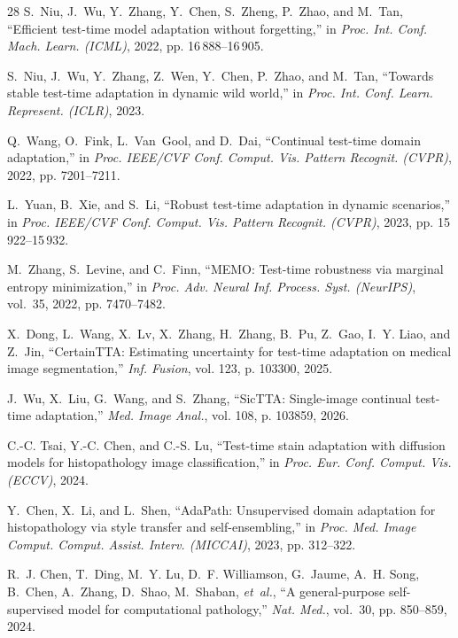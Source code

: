 \documentclass[journal]{IEEEtran}
\begin{document}
\begin{thebibliography}{28}
S.~Niu, J.~Wu, Y.~Zhang, Y.~Chen, S.~Zheng, P.~Zhao, and M.~Tan, ``Efficient test-time model adaptation without forgetting,'' in \emph{Proc. Int. Conf. Mach. Learn. (ICML)}, 2022, pp. 16\,888--16\,905.

S.~Niu, J.~Wu, Y.~Zhang, Z.~Wen, Y.~Chen, P.~Zhao, and M.~Tan, ``Towards stable test-time adaptation in dynamic wild world,'' in \emph{Proc. Int. Conf. Learn. Represent. (ICLR)}, 2023.

Q.~Wang, O.~Fink, L.~Van~Gool, and D.~Dai, ``Continual test-time domain adaptation,'' in \emph{Proc. IEEE/CVF Conf. Comput. Vis. Pattern Recognit. (CVPR)}, 2022, pp. 7201--7211.

L.~Yuan, B.~Xie, and S.~Li, ``Robust test-time adaptation in dynamic scenarios,'' in \emph{Proc. IEEE/CVF Conf. Comput. Vis. Pattern Recognit. (CVPR)}, 2023, pp. 15\,922--15\,932.

M.~Zhang, S.~Levine, and C.~Finn, ``{MEMO}: Test-time robustness via marginal entropy minimization,'' in \emph{Proc. Adv. Neural Inf. Process. Syst. (NeurIPS)}, vol.~35, 2022, pp. 7470--7482.

X.~Dong, L.~Wang, X.~Lv, X.~Zhang, H.~Zhang, B.~Pu, Z.~Gao, I.~Y. Liao, and Z.~Jin, ``{CertainTTA}: Estimating uncertainty for test-time adaptation on medical image segmentation,'' \emph{Inf. Fusion}, vol. 123, p. 103300, 2025.

J.~Wu, X.~Liu, G.~Wang, and S.~Zhang, ``{SicTTA}: Single-image continual test-time adaptation,'' \emph{Med. Image Anal.}, vol. 108, p. 103859, 2026.

C.-C. Tsai, Y.-C. Chen, and C.-S. Lu, ``Test-time stain adaptation with diffusion models for histopathology image classification,'' in \emph{Proc. Eur. Conf. Comput. Vis. (ECCV)}, 2024.

Y.~Chen, X.~Li, and L.~Shen, ``{AdaPath}: Unsupervised domain adaptation for histopathology via style transfer and self-ensembling,'' in \emph{Proc. Med. Image Comput. Comput. Assist. Interv. (MICCAI)}, 2023, pp. 312--322.

R.~J. Chen, T.~Ding, M.~Y. Lu, D.~F. Williamson, G.~Jaume, A.~H. Song, B.~Chen, A.~Zhang, D.~Shao, M.~Shaban, \emph{et~al.}, ``A general-purpose self-supervised model for computational pathology,'' \emph{Nat. Med.}, vol.~30, pp. 850--859, 2024.


\end{thebibliography}
\end{document}

